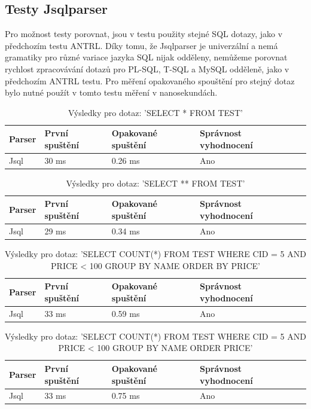 \documentclass[czech,bachelor,public,dept460,male,cpdeclaration,twoside]{diploma}
\begin{document}
\subsection{Testy Jsqlparser}
Pro možnost testy porovnat, jsou v testu použity stejné SQL dotazy, jako v předchozím testu ANTRL. Díky tomu, že Jsqlparser je univerzální a nemá gramatiky pro různé variace jazyka SQL nijak odděleny, nemůžeme porovnat rychlost zpracovávání dotazů pro PL-SQL, T-SQL a MySQL odděleně, jako v předchozím ANTRL testu. Pro měření opakovaného spouštění pro stejný dotaz bylo nutné použít v tomto testu měření v nanosekundách.

\begin{table}[!htbp]
	\centering
	\caption{Výsledky pro dotaz: 'SELECT * FROM TEST'}
	\label{tab:jsql1}
	\begin{tabular}{lllll}
		\toprule
		Parser & První spuštění & Opakované spuštění & Správnost vyhodnocení\\
		\midrule
		Jsql & 30 ms & 0.26 ms & Ano \\
		\midrule
	\end{tabular}
\end{table}

\begin{table}[!htbp]
	\centering
	\caption{Výsledky pro dotaz: 'SELECT ** FROM TEST'}
	\label{tab:jsql2}
	\begin{tabular}{lllll}
		\toprule
		Parser & První spuštění & Opakované spuštění & Správnost vyhodnocení\\
		\midrule
		Jsql & 29 ms & 0.34 ms & Ano \\
		\midrule
	\end{tabular}
\end{table}

\begin{table}[!htbp]
	\centering
	\caption{Výsledky pro dotaz: 'SELECT COUNT(*) FROM TEST WHERE CID = 5 AND PRICE < 100 GROUP BY NAME ORDER BY PRICE'}
	\label{tab:jsql3}
	\begin{tabular}{lllll}
		\toprule
		Parser & První spuštění & Opakované spuštění & Správnost vyhodnocení\\
		\midrule
		Jsql & 33 ms & 0.59 ms & Ano \\
		\midrule
	\end{tabular}
\end{table}

\begin{table}[!htbp]
	\centering
	\caption{Výsledky pro dotaz: 'SELECT COUNT(*) FROM TEST WHERE CID = 5 AND PRICE < 100 GROUP BY NAME ORDER PRICE'}
	\label{tab:jsql4}
	\begin{tabular}{lllll}
		\toprule
		Parser & První spuštění & Opakované spuštění & Správnost vyhodnocení\\
		\midrule
		Jsql & 33 ms & 0.75 ms & Ano \\
		\midrule
	\end{tabular}
\end{table}
\end{document}
